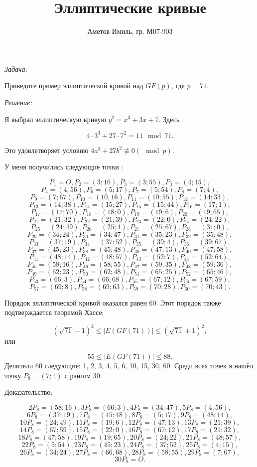 \documentclass[10pt]{article}
\author{Аметов Имиль, гр. М07-903}
\title{Эллиптические кривые}
\begin{document}
\maketitle

\emph{Задача:}

Приведите пример эллиптической кривой над $GF(p)$, где $p = 71$.

\emph{Решение:}

Я выбрал эллиптическую кривую $y^2 = x^3 + 3x + 7$. Здесь

$$4 \cdot 3^3 + 27 \cdot 7^2 = 11 \mod 71.$$

Это удовлетворяет условию $4a^3 + 27 b^2 \not \equiv 0 (\mod p)$.

У меня получились следующие точки :

$$P_1 = O, P_2 = (3; 16), P_3 = (3;55), P_4 = (4;15),$$
$$P_5 = (4;56), P_6 = (5;17), P_7 = (5;54), P_8 = (7;4),$$
$$P_9 = (7;67), P_{10} = (10,16), P_{11} = (10;55), P_{12} = (14;33),$$
$$P_{13} = (14;38), P_{14} = (15;27), P_{15} = (15;44), P_{16} = (17;1),$$
$$P_{17} = (17;70), P_{18} = (18;0), P_{19} = (19;6), P_{20} = (19;65),$$
$$P_{21} = (21;32), P_{22} = (21;39), P_{23} = (22;0), P_{24} = (24;22),$$
$$P_{25} = (24;49), P_{26} = (25;4), P_{27} = (25;67), P_{28} = (31;0),$$
$$P_{29} = (34;24), P_{30} =(34;47), P_{31} = (35;23), P_{32} = (35;48),$$
$$P_{33} = (37;19), P_{34} = (37;52), P_{35} = (39;4), P_{36} = (39;67),$$
$$P_{37} = (45;23), P_{38} = (45;48), P_{39} = (47;13), P_{40} = (47;58),$$
$$P_{41} = (48;14), P_{42} = (48;57), P_{43} = (52;7), P_{44} = (52;64),$$
$$P_{45} = (58;16), P_{46} = (58;55), P_{47} = (59;35), P_{48} = (59;36),$$
$$P_{49} = (62;23), P_{50} = (62;48), P_{51} = (65;25), P_{52} = (65;46),$$
$$P_{53} = (66;3), P_{54} = (66;68), P_{55} = (67;12), P_{56} = (67;59),$$
$$P_{57} = (69;8), P_{58} = (69;63), P_{59} = (70;28), P_{60} = (70;43).$$

Порядок эллиптической кривой оказался равен 60. Этот порядок также подтверждается теоремой Хассе:

$$(\sqrt{71} - 1)^2 \le |E(GF(71))| \le (\sqrt{71} + 1)^2,$$
или

$$55 \le |E(GF(71))| \le 88.$$
Делители 60 следующие: 1, 2, 3, 4, 5, 6, 10, 15, 30, 60. Среди всех точек я нашёл точку $P_8 = (7; 4)$ с рангом 30.

Доказательство:

$$2 P_8 = (58;16), 3 P_8 = (66;3), 4 P_8 = (34; 47), 5 P_8 = (4; 56),$$
$$6 P_8 = (37; 19), 7 P_8 = (45; 48), 8 P_8 = (5;17), 9 P_8 = (48; 14),$$
$$10 P_8 = (24; 49), 11 P_8 = (19; 6), 12 P_8 = (47; 13), 13 P_8 = (21; 39),$$
$$14 P_8 = (67;59), 15 P_8 = (22; 0), 16 P_8 = (67; 12), 17 P_8 = (21; 32), $$
$$18 P_8 = (47; 58), 19 P_8 = (19;65), 20 P_8 = (24; 22), 21 P_8 = (48; 57),$$
$$22 P_8 = (5; 54), 23  P_8 = (45; 23), 24 P_8 = (37; 52), 25 P_8 = (4; 15),$$
$$26 P_8 = (34; 24), 27 P_8 = (66,68), 28 P_8 = (58; 55), 29 P_8 = (7; 67),$$
$$30 P_8 = O.$$
\end{document}
